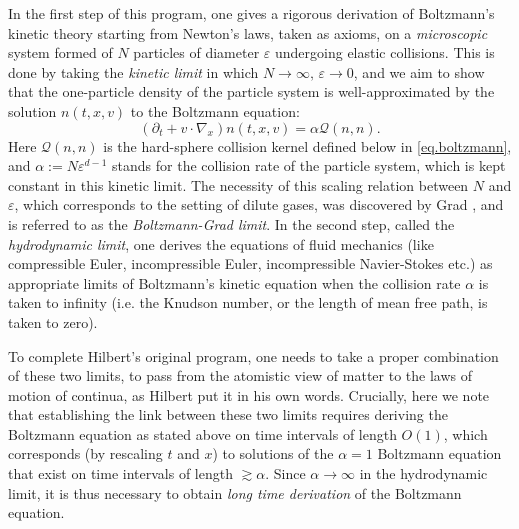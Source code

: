 \documentclass[10pt, reqno]{amsart}
\newcommand{\Qc}{\mathcal Q}
\theoremstyle{definition}
\theoremstyle{remark}
\numberwithin{equation}{section}
\begin{document}
 
 In the first step of this program, one gives a rigorous derivation of Boltzmann's kinetic theory starting from Newton's laws, taken as axioms, on a \emph{microscopic} system formed of $N$ particles of diameter $\varepsilon$ undergoing elastic collisions. This is done by taking the \emph{kinetic limit} in which $N\to \infty, \,\varepsilon \to 0$, and we aim to show that the one-particle density of the particle system is well-approximated by the solution $n(t, x,v)$ to the Boltzmann equation:
\begin{equation}\label{eq.Boltzintro}
 (\partial_t +v\cdot \nabla_x) n(t, x, v) =\alpha \mathcal Q(n, n).
 \end{equation}
 Here $\Qc(n, n)$ is the hard-sphere collision kernel defined below in \eqref{eq.boltzmann}, and $\alpha:=N \varepsilon^{d-1}$ stands for the collision rate of the particle system, which is kept constant in this kinetic limit. The necessity of this scaling relation between $N$ and $\varepsilon$, which corresponds to the setting of dilute gases, was discovered by Grad \cite{Grad58}, and is referred to as the \emph{Boltzmann-Grad limit}. In the second step, called the \emph{hydrodynamic limit}, one derives the equations of fluid mechanics (like compressible Euler, incompressible Euler, incompressible Navier-Stokes etc.) as appropriate limits of Boltzmann's kinetic equation when the collision rate $\alpha$ is taken to infinity (i.e. the Knudson number, or the length of mean free path, is taken to zero).

To complete Hilbert's original program, one needs to take a proper combination of these two limits, to pass from the atomistic view of matter to the laws of motion of continua, as Hilbert put it in his own words. Crucially, here we note that establishing the link between these two limits requires deriving the Boltzmann equation as stated above on time intervals of length $O(1)$, which corresponds (by rescaling $t$ and $x$) to solutions of the $\alpha=1$ Boltzmann equation that exist on time intervals of length $\gtrsim \alpha$. Since $\alpha\to\infty$ in the hydrodynamic limit, it is thus necessary to obtain \emph{long time derivation} of the Boltzmann equation.
 
 \medskip
 
\end{document}
